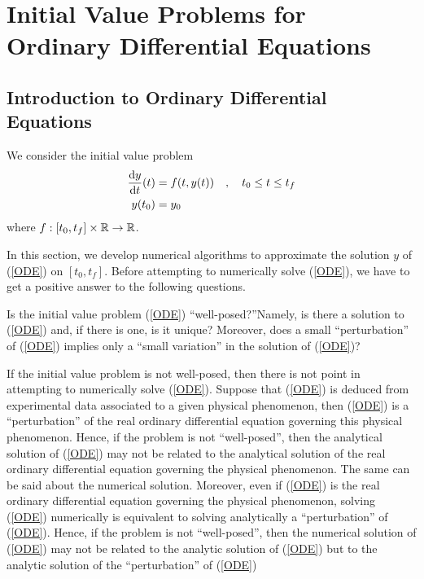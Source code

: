 \chapter[Initial Value Problems]{Initial Value Problems for Ordinary Differential Equations} 
\label{chaptInitVal}

\section{Introduction to Ordinary Differential Equations}

We consider the initial value problem
\begin{equation} \label{ODE}
\begin{split}
\frac{\mathrm{d}y}{\mathrm{d}{t}}(t) &= f(t,y(t)) \quad,\quad t_0 \leq t \leq t_f \\
y(t_0) & = y_0
\end{split}
\end{equation}
where $f:[t_0,t_f]\times\mathbb{R} \rightarrow \mathbb{R}$.

In this section, we develop numerical algorithms to approximate the
solution $y$ of (\ref{ODE}) on $[t_0,t_f]$.  Before attempting to
numerically solve (\ref{ODE}), we have to get a positive answer to the
following questions.

\begin{Quest*}
Is the initial value problem (\ref{ODE})
``well-posed?''\quad Namely, is there a solution to (\ref{ODE}) and, if
there is one, is it unique?  Moreover, does a small ``perturbation''
of (\ref{ODE}) implies only a ``small variation'' in the solution of
(\ref{ODE})?
\end{Quest*}

If the initial value problem is not well-posed, then there is not
point in attempting to numerically solve (\ref{ODE}).  Suppose that
(\ref{ODE}) is deduced from experimental data associated to a given
physical phenomenon, then (\ref{ODE}) is a ``perturbation'' of the
real ordinary differential equation governing this physical
phenomenon.  Hence, if the problem is not ``well-posed'', then the
analytical solution of (\ref{ODE}) may not be related
to the analytical solution of the real ordinary differential equation
governing the physical phenomenon.  The same can be said about the
numerical solution.  Moreover, even if (\ref{ODE}) is
the real ordinary differential equation governing the physical
phenomenon, solving (\ref{ODE}) numerically is equivalent to solving
analytically a ``perturbation'' of (\ref{ODE}).  Hence, if the problem
is not ``well-posed'', then the numerical solution of (\ref{ODE}) may
not be related to the analytic solution of (\ref{ODE}) but to the
analytic solution of the ``perturbation'' of (\ref{ODE})

